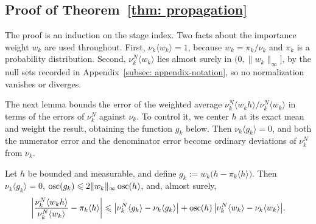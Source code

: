 \documentclass{article}
\begin{document}
\subsection{Proof of Theorem~\ref{thm: propagation}}
\label{subsec: appendix-proof}

The proof is an induction on the stage index. Two facts about the importance weight $w_k$ are used throughout. First, $\nu_k\langle w_k\rangle = 1$, because $w_k=\pi_k/\nu_k$ and $\pi_k$ is a probability distribution. Second, $\nu_k^N\langle w_k\rangle$ lies almost surely in $(0,\lVert w_k\rVert_\infty]$, by the null sets recorded in Appendix~\ref{subsec: appendix-notation}, so no normalization vanishes or diverges.

The next lemma bounds the error of the weighted average $\nu_k^N\langle w_kh\rangle/\nu_k^N\langle w_k\rangle$ in terms of the errors of $\nu_k^N$ against $\nu_k$. To control it, we center $h$ at its exact mean and weight the result, obtaining the function $g_k$ below. Then $\nu_k\langle g_k\rangle=0$, and both the numerator error and the denominator error become ordinary deviations of $\nu_k^N$ from $\nu_k$.

\begin{lemma}
\label{lem: onestep}
Let $h$ be bounded and measurable, and define $g_k := w_k\bigl(h-\pi_k\langle h\rangle\bigr)$. Then $\nu_k\langle g_k\rangle=0$, $\operatorname{osc}(g_k)\leqslant2\lVert w_k\rVert_\infty\operatorname{osc}(h)$, and, almost surely,
\begin{equation}
    \biggl|\frac{\nu_k^N\langle w_kh\rangle}{\nu_k^N\langle w_k\rangle}-\pi_k\langle h\rangle\biggr|
    \leqslant \bigl|\nu_k^N\langle g_k\rangle-\nu_k\langle g_k\rangle\bigr|
    + \operatorname{osc}(h)\,\bigl|\nu_k^N\langle w_k\rangle-\nu_k\langle w_k\rangle\bigr| .
    \label{eq: appendix-onestep}
\end{equation}
\end{lemma}
\end{document}
